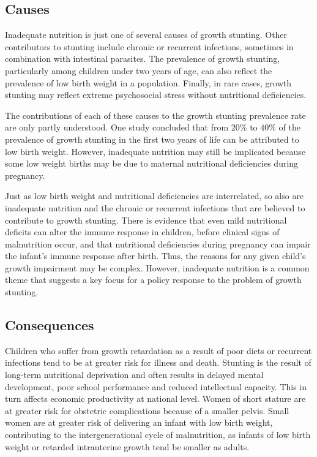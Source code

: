 \documentclass[10pt,twocolumn,letterpaper]{article}
\begin{document}
\subsection {Causes}

Inadequate nutrition is just one of several causes of growth stunting. Other contributors to stunting include chronic or recurrent infections, sometimes in combination with intestinal parasites. The prevalence of growth stunting, particularly among children under two years of age, can also reflect the prevalence of low birth weight in a population. Finally, in rare cases, growth stunting may reflect extreme psychosocial stress without nutritional deficiencies.

The contributions of each of these causes to the growth stunting prevalence rate are only partly understood. One study concluded that from $20\%$ to $40\%$ of the prevalence of growth stunting in the first two years of life can be attributed to low birth weight. However, inadequate nutrition may still be implicated because some low weight births may be due to maternal nutritional deficiencies during pregnancy.

Just as low birth weight and nutritional deficiencies are interrelated, so also are inadequate nutrition and the chronic or recurrent infections that are believed to contribute to growth stunting. There is evidence that even mild nutritional deficits can alter the immune response in children, before clinical signs of malnutrition occur, and that nutritional deficiencies during pregnancy can impair the infant's immune response after birth. Thus, the reasons for any given child's growth impairment may be complex. However, inadequate nutrition is a common theme that suggests a key focus for a policy response to the problem of growth stunting.



\subsection{Consequences}

Children who suffer from growth retardation as a result of poor diets or recurrent infections tend to be at greater risk for illness and death. Stunting is the result of long-term nutritional deprivation and often results in delayed mental development, poor school performance and reduced intellectual capacity. This in turn affects economic productivity at national level. Women of short stature are at greater risk for obstetric complications because of a smaller pelvis. Small women are at greater risk of delivering an infant with low birth weight, contributing to the intergenerational cycle of malnutrition, as infants of low birth weight or retarded intrauterine growth tend be smaller as adults.
\end{document}
